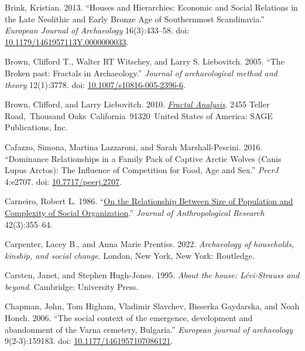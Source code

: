 \documentclass[
  12pt,
]{book}
\newlength{\cslhangindent}
\newlength{\cslentryspacingunit} %
\newenvironment{CSLReferences}[2] %
 {%
  \setlength{\parindent}{0pt}
  \ifodd #1
  \let\oldpar\par
  \def\par{\hangindent=\cslhangindent\oldpar}
  \fi
  \setlength{\parskip}{#2\cslentryspacingunit}
 }%
 {}
\begin{document}
\begin{CSLReferences}{1}{0}
\leavevmode{}%
Brink, Kristian. 2013. {``Houses and Hierarchies: Economic and Social Relations in the Late Neolithic and Early Bronze Age of Southernmost Scandinavia.''} \emph{European Journal of Archaeology} 16(3):433--58. doi: \href{https://doi.org/10.1179/1461957113Y.0000000033}{10.1179/1461957113Y.0000000033}.

\leavevmode{}%
Brown, Clifford T., Walter RT Witschey, and Larry S. Liebovitch. 2005. {``The Broken past: Fractals in Archaeology.''} \emph{Journal of archaeological method and theory} 12(1):3778. doi: \href{https://doi.org/10.1007/s10816-005-2396-6}{10.1007/s10816-005-2396-6}.

\leavevmode{}%
Brown, Clifford, and Larry Liebovitch. 2010. \emph{\href{https://doi.org/10.4135/9781412993876}{Fractal Analysis}}. 2455 Teller Road,~Thousand Oaks~California~91320~United States of America: SAGE Publications, Inc.

\leavevmode{}%
Cafazzo, Simona, Martina Lazzaroni, and Sarah Marshall-Pescini. 2016. {``Dominance Relationships in a Family Pack of Captive Arctic Wolves (Canis Lupus Arctos): The Influence of Competition for Food, Age and Sex.''} \emph{PeerJ} 4:e2707. doi: \href{https://doi.org/10.7717/peerj.2707}{10.7717/peerj.2707}.

\leavevmode{}%
Carneiro, Robert L. 1986. {``\href{http://www.jstor.org/stable/3630039}{On the Relationship Between Size of Population and Complexity of Social Organization}.''} \emph{Journal of Anthropological Research} 42(3):355--64.

\leavevmode{}%
Carpenter, Lacey B., and Anna Marie Prentiss. 2022. \emph{Archaeology of households, kinship, and social change}. London, New York, New York: Routledge.

\leavevmode{}%
Carsten, Janet, and Stephen Hugh-Jones. 1995. \emph{About the house: Lévi-Strauss and beyond}. Cambridge: University Press.

\leavevmode{}%
Chapman, John, Tom Higham, Vladimir Slavchev, Bisserka Gaydarska, and Noah Honch. 2006. {``The social context of the emergence, development and abandonment of the Varna cemetery, Bulgaria.''} \emph{European journal of archaeology} 9(2-3):159183. doi: \href{https://doi.org/10.1177/1461957107086121}{10.1177/1461957107086121}.


\end{CSLReferences}
\end{document}
